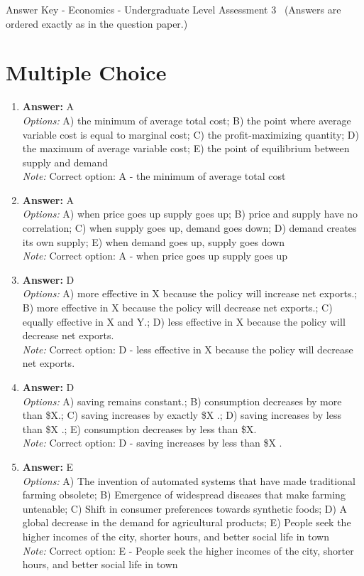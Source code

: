 \documentclass[12pt]{article}
\begin{document}
\begin{center}
Answer Key - Economics - Undergraduate Level Assessment 3 \
\small (Answers are ordered exactly as in the question paper.)
\end{center}

\section*{Multiple Choice}
\begin{enumerate}[label=\arabic*.]
\item \textbf{Answer:} A
\\ \textit{Options:} A) the minimum of average total cost; B) the point where average variable cost is equal to marginal cost; C) the profit-maximizing quantity; D) the maximum of average variable cost; E) the point of equilibrium between supply and demand
\\ \textit{Note:} Correct option: A - the minimum of average total cost
\item \textbf{Answer:} A
\\ \textit{Options:} A) when price goes up supply goes up; B) price and supply have no correlation; C) when supply goes up, demand goes down; D) demand creates its own supply; E) when demand goes up, supply goes down
\\ \textit{Note:} Correct option: A - when price goes up supply goes up
\item \textbf{Answer:} D
\\ \textit{Options:} A) more effective in X because the policy will increase net exports.; B) more effective in X because the policy will decrease net exports.; C) equally effective in X and Y.; D) less effective in X because the policy will decrease net exports.
\\ \textit{Note:} Correct option: D - less effective in X because the policy will decrease net exports.
\item \textbf{Answer:} D
\\ \textit{Options:} A) saving remains constant.; B) consumption decreases by more than \$X.; C) saving increases by exactly \$X .; D) saving increases by less than \$X .; E) consumption decreases by less than \$X.
\\ \textit{Note:} Correct option: D - saving increases by less than \$X .
\item \textbf{Answer:} E
\\ \textit{Options:} A) The invention of automated systems that have made traditional farming obsolete; B) Emergence of widespread diseases that make farming untenable; C) Shift in consumer preferences towards synthetic foods; D) A global decrease in the demand for agricultural products; E) People seek the higher incomes of the city, shorter hours, and better social life in town
\\ \textit{Note:} Correct option: E - People seek the higher incomes of the city, shorter hours, and better social life in town
\end{enumerate}
\end{document}
